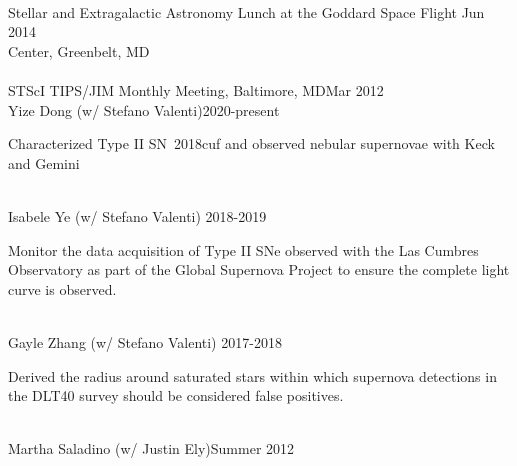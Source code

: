 \documentclass[10pt]{cv}
\begin{document}
\begin{llist}
\\
Stellar and Extragalactic Astronomy Lunch at the Goddard Space Flight  \hfill Jun 2014\\  
Center, Greenbelt, MD \\ \vspace{-0.1in}  %
\\
STScI TIPS/JIM Monthly Meeting, Baltimore, MD\hfill Mar 2012\\\vspace{-0.1in}  
\vspace{-0.1in}  
Yize Dong (w/ Stefano Valenti)\hfill 2020-present\\
\begin{minipage}[l]{0.7\textwidth}\vspace{0.15cm}
Characterized Type II SN~2018cuf and observed nebular supernovae with Keck and Gemini\\
\end{minipage}\vspace{0.15cm}
\\
Isabele Ye (w/ Stefano Valenti) \hfill 2018-2019\\
\begin{minipage}[l]{0.7\textwidth}\vspace{0.15cm}
Monitor the data acquisition of Type II SNe observed with the Las Cumbres Observatory as part of the Global Supernova Project to ensure the complete light curve is observed.\\
\end{minipage}\vspace{0.15cm}
\\
Gayle Zhang (w/ Stefano Valenti) \hfill 2017-2018\\
\begin{minipage}[l]{0.7\textwidth}\vspace{0.15cm}
Derived the radius around saturated stars within which supernova detections in the DLT40 survey should be considered false positives.\\
\end{minipage}\vspace{0.15cm}
\\
Martha Saladino (w/ Justin Ely)\hfill Summer 2012\\

\end{llist}
\end{document}
